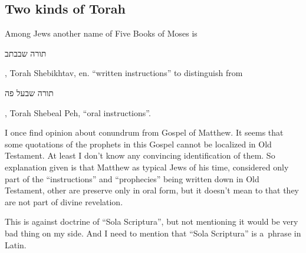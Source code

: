\documentclass[a4paper,11pt]{article}
\begin{document}
\subsection{Two kinds of Torah} %



Among Jews another name of Five Books of Moses is \begin{hebrew} תורה שבבתב
\end{hebrew}, Torah Shebikhtav, en. ``written instructions'' to distinguish
from \begin{hebrew} תורה שבעל פה \end{hebrew}, Torah Shebeal Peh, ``oral
instructions''.

I once find opinion about conundrum from Gospel of Matthew. It seems that
some quotations of the prophets in this Gospel cannot be localized in Old
Testament. At least I don't know any convincing identification of them. So
explanation given is that Matthew as typical Jews of his time, considered
only part of the ``instructions'' and ``prophecies'' being written down in
Old Testament, other are preserve only in oral form, but it doesn't mean to
that they are not part of divine revelation.

This is against doctrine of ``Sola Scriptura'', but not mentioning it would
be very bad thing on my side. And I need to mention that ``Sola Scriptura''
is a~phrase in Latin.
\end{document}
